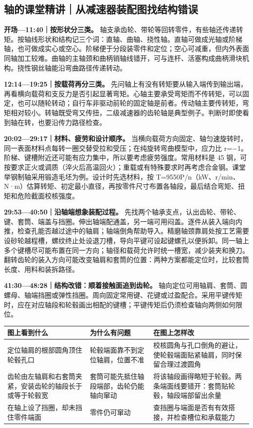 \documentclass[zihao=5,a4paper,UTF8,fontset=fandol]{ctexart}
\begin{document}
\subsection{轴的课堂精讲｜从减速器装配图找结构错误}

\textbf{开场—11:40｜按形状分三类。} 轴支承齿轮、带轮等回转零件，有些轴还传递转矩。按轴线形状和结构记三个词：直轴、曲轴、挠性轴。直轴可做成光轴或阶梯轴，也可做成实心或空心。阶梯便于分段装零件和定位；空心可减重，但内外表面同轴加工较难。曲轴的主轴颈和曲柄销轴线错开，可与连杆、活塞构成曲柄滑块机构。挠性钢丝轴能沿弯曲路径传递转动。


\textbf{12:14—19:25｜按载荷再分三类。} 先问轴上有没有转矩要从输入端传到输出端，再看横向载荷和支反力是否引起显著弯矩。心轴主要承受弯矩而不传转矩，可以固定，也可以随轮转动；自行车非驱动前轮的固定轴是前者。传动轴主要传转矩，弯矩相对较小。转轴既受弯又传扭，二级减速器的齿轮轴是典型例子。判断时即使看到轴在转，也要沿传力路径检查。


\textbf{20:02—29:17｜材料、疲劳和设计顺序。} 当横向载荷方向固定、轴匀速旋转时，同一表面材料点每转一圈交替受拉和受压；在纯旋转弯曲模型中，应力比 r=$-$1。阶梯、键槽附近还可能有应力集中，所以要考虑疲劳强度。常用材料是 45 钢，可按要求正火或调质（淬火后高温回火）；重载或有特殊要求时再考虑合金钢。课堂举钢制轴采用锻造毛坯为例。设计时先选材料，按 T=9550P/n（kW、r/min、N·m）估算转矩、初定最小直径，再按零件尺寸布置各轴段，最后结合弯矩、扭矩和危险截面校核强度。


\textbf{29:53—40:50｜沿轴端想象装配过程。} 先找两个轴承支点，认出齿轮、带轮、键、套筒、端盖与挡圈。伸出轴端配通盖，另一端可用闷盖。逐件从装入端向内推，检查孔能否越过途中的轴肩；轴端倒角帮助导入。精磨轴颈靠肩处按工艺需要设砂轮越程槽，螺纹终止处设退刀槽，导向平键可设起键螺孔以便拆卸。同一轴上多个键槽尽可能布置在同一方向；轴径和载荷允许时统一槽宽，减少装夹和换刀。翻转齿轮的装入方向可能改变轴肩和套筒的位置：两种方案都能定位时，比较套筒长度、用料和装拆路径。


\textbf{41:30—48:28｜结构改错：顺着接触面追到齿轮。} 轴向定位可用轴肩、套筒、圆螺母、轴端挡圈或弹性挡圈。周向固定常用键、花键或过盈配合。采用平键传矩时，应在对应轴段和轮毂画出相配的键槽；平键传矩后仍须检查轴向两侧如何限位。


\begin{longtable}{p{4.86cm}p{4.86cm}p{4.86cm}}
\toprule
图上看到什么 & 为什么有问题 & 在图上怎样改 \\

\midrule
\endhead
定位轴肩的根部圆角顶住轮毂孔口 & 轮毂端面靠不到定位轴肩，位置不准 & 校核圆角与孔口倒角的避让，使轮毂端面贴紧轴肩，同时保留合理过渡圆角 \\
齿轮由左轴肩和右套筒夹紧，安装齿轮的轴段长于或等于轮毂宽 & 套筒可能先抵住轴段端部，齿轮仍能轴向窜动 & 将该轴段画得略短于轮毂。两条端面线要错开：套筒贴轮毂，轴段端部留出余量 \\
在轴上设了挡圈，却未挡住零件端面 & 零件仍可窜动 & 查挡圈与端面是否有有效搭接，并检查槽位和承载能力 \\
\bottomrule
\end{longtable}
\end{document}
